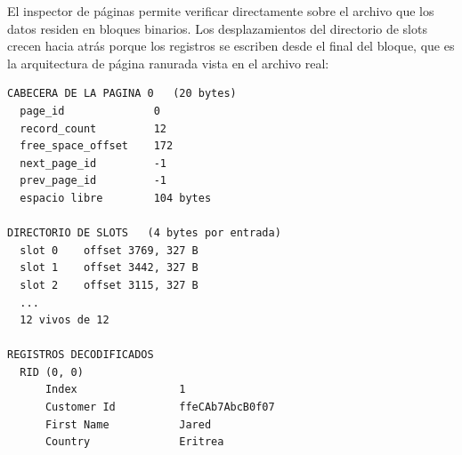 \documentclass[a4paper,12pt]{article}
\begin{document}
El inspector de páginas permite verificar directamente sobre el archivo que los
datos residen en bloques binarios. Los desplazamientos del directorio de slots
crecen hacia atrás porque los registros se escriben desde el final del bloque,
que es la arquitectura de página ranurada vista en el archivo real:

\begin{lstlisting}[caption={Salida del inspector sobre la primera página}]
CABECERA DE LA PAGINA 0   (20 bytes)
  page_id              0
  record_count         12
  free_space_offset    172
  next_page_id         -1
  prev_page_id         -1
  espacio libre        104 bytes

DIRECTORIO DE SLOTS   (4 bytes por entrada)
  slot 0    offset 3769, 327 B
  slot 1    offset 3442, 327 B
  slot 2    offset 3115, 327 B
  ...
  12 vivos de 12

REGISTROS DECODIFICADOS
  RID (0, 0)
      Index                1
      Customer Id          ffeCAb7AbcB0f07
      First Name           Jared
      Country              Eritrea
\end{lstlisting}
\end{document}
